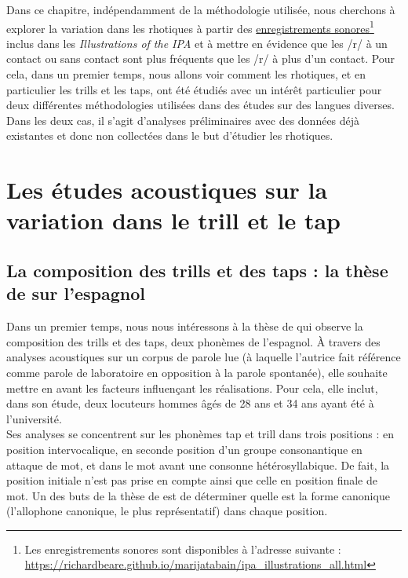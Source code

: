Dans ce chapitre, indépendamment de la méthodologie utilisée, nous cherchons à explorer la variation dans les rhotiques à partir des \href{https://richardbeare.github.io/marijatabain/ipa_illustrations_all.html}{enregistrements sonores}\footnote{Les enregistrements sonores sont disponibles à l'adresse suivante : \url{https://richardbeare.github.io/marijatabain/ipa\_illustrations\_all.html}} inclus dans les \textit{Illustrations of the IPA} et à mettre en évidence que les /r/ à un contact ou sans contact sont plus fréquents que les /r/ à plus d'un contact. Pour cela, dans un premier temps, nous allons voir comment les rhotiques, et en particulier les trills et les taps, ont été étudiés avec un intérêt particulier pour deux différentes méthodologies utilisées dans des études sur des langues diverses. Dans les deux cas, il s'agit d'analyses préliminaires avec des données déjà existantes et donc non collectées dans le but d'étudier les rhotiques.

\section{Les études acoustiques sur la variation dans le trill et le tap}

\subsection{La composition des trills et des taps : la thèse de \citeauthor{blecuaVibrantesEspanolManifestaciones2002} sur l'espagnol}

Dans un premier temps, nous nous intéressons à la thèse de \textcite{blecuaVibrantesEspanolManifestaciones2002} qui observe la composition des trills et des taps, deux phonèmes de l'espagnol. À travers des analyses acoustiques sur un corpus de parole lue (à laquelle l'autrice fait référence comme parole de laboratoire en opposition à la parole spontanée), elle souhaite mettre en avant les facteurs influençant les réalisations. Pour cela, elle inclut, dans son étude, deux locuteurs hommes âgés de 28 ans et 34 ans ayant été à l’université.\\

Ses analyses se concentrent sur les phonèmes tap et trill dans trois positions : en position intervocalique, en seconde position d'un groupe consonantique en attaque de mot, et dans le mot avant une consonne hétérosyllabique. De fait, la position initiale n'est pas prise en compte ainsi que celle en position finale de mot. Un des buts de la thèse de \citeauthor{blecuaVibrantesEspanolManifestaciones2002} est de déterminer quelle est la forme canonique (l'allophone canonique, le plus représentatif) dans chaque position.\\

